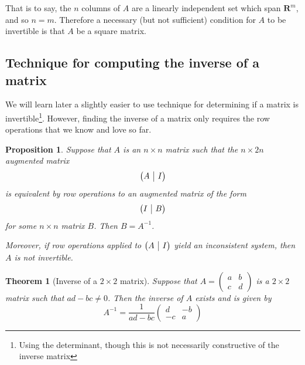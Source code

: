 \documentclass[12pt]{article}
\makeatletter
\numberwithin{equation}{subsection}
\numberwithin{figure}{subsection}
\newtheorem{thm}[subsection]{Theorem}
\newtheorem{prop}[subsection]{Proposition}
\theoremstyle{note}
\newenvironment{amatrix}[1]{%
  \left(\begin{array}{@{}*{#1}{c}|c@{}}
}{%
  \end{array}\right)
}
\makeatother
\begin{document}
That is to say, the $n$ columns of $A$ are a linearly independent set which span $\mathbf{R}^m$, and so $n=m$. Therefore a necessary (but not sufficient) condition for $A$ to be invertible is that $A$ be a square matrix. 

\subsection{Technique for computing the inverse of a matrix}

We will learn later a slightly easier to use technique for determining if a matrix is invertible\footnote{Using the determinant, though this is not necessarily constructive of the inverse matrix}. However, finding the inverse of a matrix only requires the row operations that we know and love so far.  

\begin{prop} \label{prop-compute-inv} Suppose that $A$ is an $n\times n$ matrix such that the $n\times 2n$ augmented matrix  \[ \begin{amatrix}{1} A & I \end{amatrix}\]
is equivalent by row operations to an augmented matrix of the form \[\begin{amatrix}{1} I & B\end{amatrix}\] for some $n\times n$ matrix $B$. Then $B=A^{-1}$. 

Moreover, if row operations applied to $\begin{amatrix}{1} A & I \end{amatrix}$ yield an inconsistent system, then $A$ is not invertible. 
\end{prop}


\begin{thm}[Inverse of a $2\times 2$ matrix] \label{thm-2x2-inv}
Suppose that $A=\begin{pmatrix} a & b \\ c & d\end{pmatrix}$ is a $2\times 2$ matrix such that $ad-bc\neq 0$. Then the inverse of $A$ exists and is given by \begin{equation}  \label{eq-inv-of-2x2}
	A^{-1}=\dfrac{1}{ad-bc}\begin{pmatrix} d & -b \\ -c & a \end{pmatrix}
\end{equation}
\end{thm}
\end{document}
